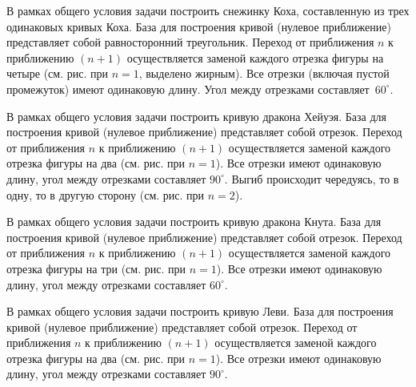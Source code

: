 
\begin{zztask}
В рамках общего условия задачи построить снежинку Коха, составленную из
трех одинаковых кривых Коха. База для построения кривой (нулевое приближение) 
представляет собой равносторонний треугольник. Переход от приближения
$n$ к приближению $(n+1)$ осуществляется заменой каждого отрезка фигуры на четыре
(см. рис. при $n=1$, выделено жирным). Все отрезки (включая пустой промежуток)
имеют одинаковую длину. Угол между отрезками \mbox{составляет $60^\circ$}.
\par
\end{zztask}


\begin{zztask}
В рамках общего условия задачи построить кривую дракона Хейуэя. База для 
построения кривой (нулевое приближение) представляет собой отрезок. Переход 
от приближения $n$ к приближению $(n+1)$ осуществляется заменой каждого 
отрезка фигуры на два (см. рис. при $n=1$). Все отрезки 
имеют одинаковую длину, угол между отрезками составляет $90^\circ$.
Выгиб происходит чередуясь, то в одну, то в другую сторону (см. рис. при $n=2$).
\par
\end{zztask}



\begin{zztask}
В рамках общего условия задачи построить кривую дракона Кнута. База для 
построения кривой (нулевое приближение) представляет собой отрезок. Переход 
от приближения $n$ к приближению $(n+1)$ осуществляется заменой каждого 
отрезка фигуры на три (см. рис. при $n=1$). Все отрезки 
имеют одинаковую длину, угол между отрезками составляет $60^\circ$.
\par
\end{zztask}


\begin{zztask}
В рамках общего условия задачи построить кривую Леви. База для 
построения кривой (нулевое приближение) представляет собой отрезок. Переход 
от приближения $n$ к приближению $(n+1)$ осуществляется заменой каждого 
отрезка фигуры на два (см. рис. при $n=1$). Все отрезки 
имеют одинаковую длину, угол между отрезками составляет $90^\circ$.
\par
\end{zztask}

